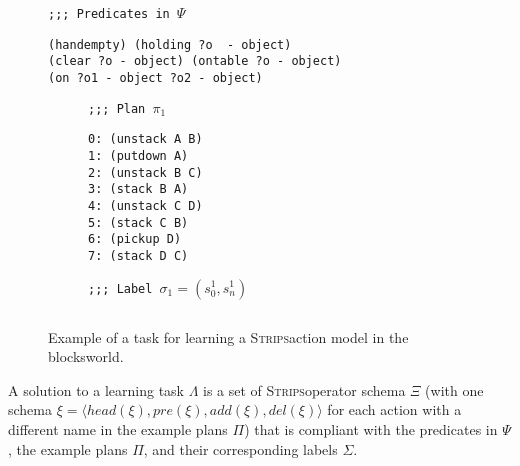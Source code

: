 \documentclass[letterpaper]{article} %
\newcommand{\tup}[1]{{\langle #1 \rangle}}
\newcommand{\strips}{\textsc{Strips}}     %
\begin{document}
\begin{figure}
\begin{small}
{\tt ;;; Predicates in $\Psi$}
\begin{verbatim}
(handempty) (holding ?o  - object)
(clear ?o - object) (ontable ?o - object)
(on ?o1 - object ?o2 - object)
\end{verbatim}
\end{small}

\vspace{0.5cm}

\begin{subfigure}{.25\textwidth}
\begin{small}
{\tt ;;; Plan $\pi_1$}
\begin{verbatim}
0: (unstack A B)
1: (putdown A)
2: (unstack B C)
3: (stack B A)
4: (unstack C D)
5: (stack C B)
6: (pickup D)
7: (stack D C)
\end{verbatim}
\end{small}
\end{subfigure}%
\begin{subfigure}{.6\textwidth}
{\small\tt ;;; Label $\sigma_1=(s_0^1,s_{n}^1)$}
\begin{lstlisting}[mathescape]
\end{lstlisting}
\vspace{0.1cm}
\vspace{0.6cm}
\end{subfigure}%

 \caption{\small Example of a task for learning a \strips action model in the blocksworld.}
\label{fig:lexample}
\end{figure}

A solution to a learning task $\Lambda$ is a set of \strips operator schema $\Xi$ (with one schema $\xi=\tup{head(\xi),pre(\xi),add(\xi),del(\xi)}$ for each action with a different name in the example plans $\Pi$) that is compliant with the predicates in $\Psi$, the example plans $\Pi$, and their corresponding labels $\Sigma$.
\end{document}
